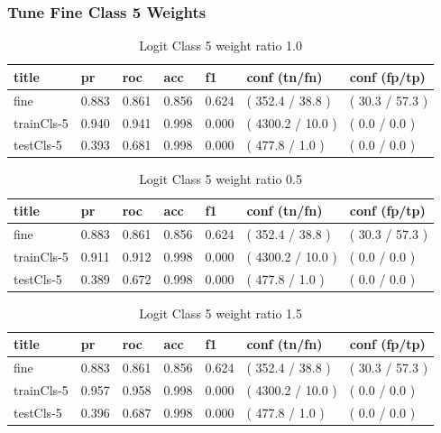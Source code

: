\documentclass[ms]{nuthesis}
\begin{document}
\subsubsection{Tune Fine Class 5 Weights}
\FloatBarrier
\begin{table}[H]
\centering
\caption{Logit Class 5 weight ratio 1.0}
\label{tab:LogRegCls5-Wt1}
\begin{tabular}{|l||l||l||l||l||l||l|}\toprule
title & pr & roc & acc & f1 & conf (tn/fn) & conf (fp/tp) \\ \midrule
fine & 0.883 & 0.861 & 0.856 & 0.624 & ( 352.4 / 38.8 ) & ( 30.3 / 57.3 ) \\
trainCls-5 & 0.940 & 0.941 & 0.998 & 0.000 & ( 4300.2 / 10.0 ) & ( 0.0 / 0.0 ) \\
testCls-5 & 0.393 & 0.681 & 0.998 & 0.000 & ( 477.8 / 1.0 ) & ( 0.0 / 0.0 ) \\ \bottomrule
\end{tabular}
\end{table}
\FloatBarrier


\FloatBarrier
\begin{table}[H]
\centering
\caption{Logit Class 5 weight ratio 0.5}
\label{tab:LogRegCls5-Wtp5}
\begin{tabular}{|l||l||l||l||l||l||l|}\toprule
title & pr & roc & acc & f1 & conf (tn/fn) & conf (fp/tp) \\ \midrule
fine & 0.883 & 0.861 & 0.856 & 0.624 & ( 352.4 / 38.8 ) & ( 30.3 / 57.3 ) \\
trainCls-5 & 0.911 & 0.912 & 0.998 & 0.000 & ( 4300.2 / 10.0 ) & ( 0.0 / 0.0 ) \\
testCls-5 & 0.389 & 0.672 & 0.998 & 0.000 & ( 477.8 / 1.0 ) & ( 0.0 / 0.0 ) \\ \bottomrule
\end{tabular}
\end{table}
\FloatBarrier


\FloatBarrier
\begin{table}[H]
\centering
\caption{Logit Class 5 weight ratio 1.5}
\label{tab:LogRegCls5-Wt1p5}
\begin{tabular}{|l||l||l||l||l||l||l|}\toprule
title & pr & roc & acc & f1 & conf (tn/fn) & conf (fp/tp) \\ \midrule
fine & 0.883 & 0.861 & 0.856 & 0.624 & ( 352.4 / 38.8 ) & ( 30.3 / 57.3 ) \\
trainCls-5 & 0.957 & 0.958 & 0.998 & 0.000 & ( 4300.2 / 10.0 ) & ( 0.0 / 0.0 ) \\
testCls-5 & 0.396 & 0.687 & 0.998 & 0.000 & ( 477.8 / 1.0 ) & ( 0.0 / 0.0 ) \\ \bottomrule
\end{tabular}
\end{table}
\FloatBarrier
\end{document}
